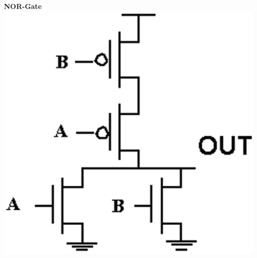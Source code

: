 \begin{minipage}[t]{0.38\columnwidth}
    \begin{center}
        \textbf{NOR-Gate} \\
        \includegraphics[width=\columnwidth]{images/cmos_nor.png}
    \end{center}
\end{minipage}


%


